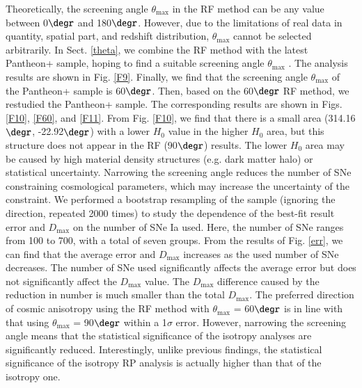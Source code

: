 \documentclass{aa}
\def\tm{$\theta_\mathrm{max}$ }
\begin{document}
Theoretically, the screening angle \tm in the RF method can be any value between 0$\degr$ and 180$\degr$. However, due to the limitations of real data in quantity, spatial part, and redshift distribution, \tm cannot be selected arbitrarily. In Sect. \ref{theta}, we combine the RF method with the latest Pantheon+ sample, hoping to find a suitable screening angle \tm. The analysis results are shown in Fig. \ref{F9}. Finally, we find that the screening angle \tm of the Pantheon+ sample is 60$\degr$. Then, based on the 60$\degr$ RF method, we restudied the Pantheon+ sample. The corresponding results are shown in Figs. \ref{F10}, \ref{F60}, and \ref{F11}. From Fig. \ref{F10}, we find that there is a small area (314.16$\degr$, -22.92$\degr$) with a lower $H_{0}$ value in the higher $H_{0}$ area, but this structure does not appear in the RF (90$\degr$) results. The lower $H_{0}$ area may be caused by high material density structures (e.g. dark matter halo) or statistical uncertainty. Narrowing the screening angle reduces the number of SNe constraining cosmological parameters, which may increase the uncertainty of the constraint. We performed a bootstrap resampling of the sample (ignoring the direction, repeated 2000 times) to study the dependence of the best-fit result error and $D_\mathrm{max}$ on the number of SNe Ia used. Here, the number of SNe ranges from 100 to 700, with a total of seven groups. From the results of Fig. \ref{err}, we can find that the average error and $D_\mathrm{max}$ increases as the used number of SNe decreases. The number of SNe used significantly affects the average error but does not significantly affect the $D_\mathrm{max}$ value. The $D_\mathrm{max}$ difference caused by the reduction in number is much smaller than the total $D_\mathrm{max}$. The preferred direction of cosmic anisotropy using the RF method with \tm = 60$\degr$ is in line with that using \tm = 90$\degr$ within a 1$\sigma$ error. However, narrowing the screening angle means that the statistical significance of the isotropy analyses are significantly reduced. Interestingly, unlike previous findings, the statistical significance of the isotropy RP analysis is actually higher than that of the isotropy one. 
\end{document}
